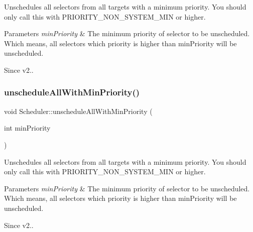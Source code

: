 Unschedules all selectors from all targets with a minimum priority. You should only call this with {\ttfamily P\+R\+I\+O\+R\+I\+T\+Y\+\_\+\+N\+O\+N\+\_\+\+S\+Y\+S\+T\+E\+M\+\_\+\+M\+IN} or higher. 
\begin{DoxyParams}{Parameters}
{\em min\+Priority} & The minimum priority of selector to be unscheduled. Which means, all selectors which priority is higher than min\+Priority will be unscheduled. \\
\hline
\end{DoxyParams}
\begin{DoxySince}{Since}
v2.. 
\end{DoxySince}
\mbox{\label{classScheduler_aa846e95ed320bdac9ca2c91a0d7e79db}} 
\subsubsection{\texorpdfstring{unschedule\+All\+With\+Min\+Priority()}{unscheduleAllWithMinPriority()}\hspace{0.1cm}{\footnotesize\ttfamily [2/2]}}
{\footnotesize\ttfamily void Scheduler\+::unschedule\+All\+With\+Min\+Priority (\begin{DoxyParamCaption}\item[{int}]{min\+Priority }\end{DoxyParamCaption})}

Unschedules all selectors from all targets with a minimum priority. You should only call this with {\ttfamily P\+R\+I\+O\+R\+I\+T\+Y\+\_\+\+N\+O\+N\+\_\+\+S\+Y\+S\+T\+E\+M\+\_\+\+M\+IN} or higher. 
\begin{DoxyParams}{Parameters}
{\em min\+Priority} & The minimum priority of selector to be unscheduled. Which means, all selectors which priority is higher than min\+Priority will be unscheduled. \\
\hline
\end{DoxyParams}
\begin{DoxySince}{Since}
v2.. 
\end{DoxySince}
\mbox{\label{classScheduler_a25e540092eabffd80c97fe2af4faf7d5}} 
